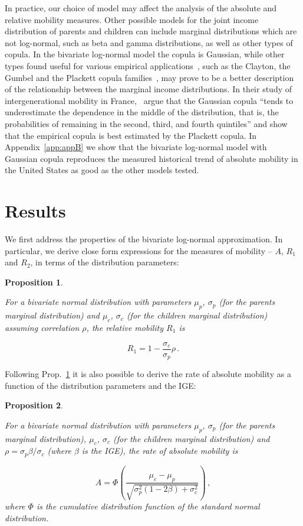 \documentclass[12pt,a4paper]{article}
\newtheorem{proposition}{Proposition}
\newcommand{\elabel}[1]{\label{eq:#1}}
\newcommand{\pref}[1]{Prop.~\ref{prop:#1}}
\newcommand{\be}{\begin{equation}}
\newcommand{\ee}{\end{equation}}
\numberwithin{equation}{section}
\begin{document}
In practice, our choice of model may affect the analysis of the absolute and relative mobility measures. Other possible models for the joint income distribution of parents and children can include marginal distributions which are not log-normal, such as beta and gamma distributions, as well as other types of copula. In the bivariate log-normal model the copula is Gaussian, while other types found useful for various empirical applications~\citep{trivedi2007copula}, such as the Clayton, the Gumbel and the Plackett copula families~\citep{bonhomme2009assessing}, may prove to be a better description of the relationship between the marginal income distributions. In their study of intergenerational mobility in France,~\citet{bonhomme2009assessing} argue that the Gaussian copula ``tends to underestimate the dependence in the middle of the distribution, that is, the probabilities of remaining in the second, third, and fourth quintiles'' and show that the empirical copula is best estimated by the Plackett copula. In Appendix~\ref{app:appB} we show that the bivariate log-normal model with Gaussian copula reproduces the measured historical trend of absolute mobility in the United States as good as the other models tested.

\section{Results}
\label{sec:results}

We first address the properties of the bivariate log-normal approximation. In particular, we derive close form expressions for the measures of mobility -- $A$, $R_1$ and $R_2$, in terms of the distribution parameters:

\begin{proposition}
\label{prop:prop1}

For a bivariate normal distribution with parameters $\mu_p$, $\sigma_p$ (for the parents marginal distribution) and $\mu_c$, $\sigma_c$ (for the children marginal distribution) assuming correlation $\rho$, the relative mobility $R_1$ is

\be
R_1 = 1-\frac{\sigma_c}{\sigma_p}\rho \,.
\elabel{beta_rho}
\ee
\end{proposition}

Following \pref{prop1} it is also possible to derive the rate of absolute mobility as a function of the distribution parameters and the IGE:

\begin{proposition}
\label{prop:prop2}

For a bivariate normal distribution with parameters $\mu_p$, $\sigma_p$ (for the parents marginal distribution), $\mu_c$, $\sigma_c$ (for the children marginal distribution) and $\rho=\sigma_p\beta/\sigma_c$ (where $\beta$ is the IGE), the rate of absolute mobility is

\be
A = \Phi\left(\frac{\mu_c - \mu_p}{\sqrt{\sigma_p^2\left(1 - 2\beta\right) + \sigma_c^2}}\right) \,,
\elabel{abs2}
\ee
where $\Phi$ is the cumulative distribution function of the standard normal distribution.
\end{proposition}
\end{document}
